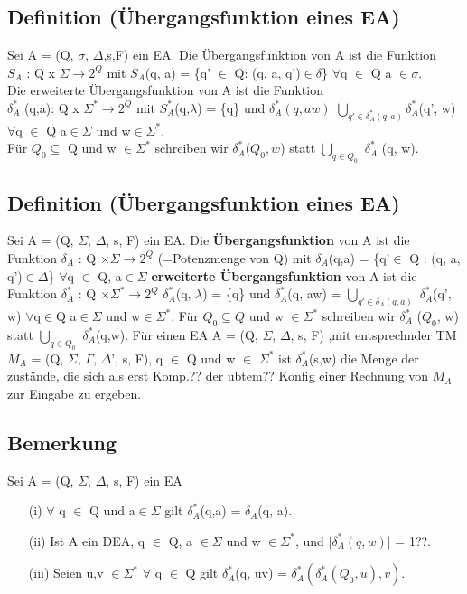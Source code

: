 \documentclass[a4paper,11pt]{article}
\begin{document}
\subsection{Definition (Übergangsfunktion eines EA)}
Sei A = (Q, $\sigma$, $\Delta$,s,F) ein EA. 
Die Übergangsfunktion von A ist die Funktion \\
$S_{A}$ : Q x $\Sigma \to 2^{Q}$ mit $S_{A}$(q, a) = \{q' $\in$ Q: (q, a, q')$\in \delta$\} $\forall$q $\in$ Q a $\in \sigma$.\\
Die erweiterte Übergangsfunktion von A ist die Funktion \\
$\delta_{A}^{*}$ (q,a): Q x $\Sigma^{*} \to 2^{Q}$ mit $S_{A}^{*}$(q,$\lambda$) = \{q\} und $\delta_{A}^{*}(q, aw)$ $\underset{q' \in \delta_{A}^{*}(q,a)}{\bigcup} \delta_{A}^{*}$(q', w) $\forall$q $\in$ Q a$\in \Sigma$ und w$\in \Sigma^{*}$.\\
Für $Q_{0} \subseteq $ Q und w $\in \Sigma^{*}$ schreiben wir $\delta_{A}^{*} $($Q_{0}, w$) statt $\underset{q \in Q_{0}}{\bigcup}$ $\delta_{A}^{*}$ (q, w).

\subsection{Definition (Übergangsfunktion eines EA)}
Sei A = (Q, $\Sigma$, $\Delta$, s, F) ein EA. Die \textbf{Übergangsfunktion} von A ist die Funktion $\delta_{A}$ : Q $\times \Sigma\rightarrow 2^{Q}$ (=Potenzmenge von Q) mit $\delta_{A}$(q,a) = \{q'$\in$ Q : (q, a, q')$\in \Delta$\} $\forall$q $\in$ Q, a$\in \Sigma$ \textbf{erweiterte Übergangsfunktion} von A ist die Funktion $\delta_{A}^{*}$ : Q $\times \Sigma^{*} \rightarrow 2^{Q}$ $\delta_{A}^{*}$(q, $\lambda$) = \{q\} und $\delta_{A}^{*}$(q, aw) = $\bigcup \limits_{q'\in \delta_{A}(q,a)}$ $\delta_{A}^{*}$(q', w) $\forall$q$\in$Q a$\in \Sigma$ und w$\in \Sigma^{*}$. Für $Q_{0} \subseteq Q$ und w $\in \Sigma^{*}$ schreiben wir $\delta_{A}^{*}$ ($Q_{0}$, w) statt $\bigcup \limits_{q \in Q_{0}}$ $\delta_{A}^{*}$(q,w). Für einen EA A = (Q, $\Sigma$, $\Delta$, s, F) ,mit entsprechnder TM $M_{A}$ = (Q, $\Sigma$, $\Gamma$, $\Delta$', s, F), q $\in$ Q und w $\in$ $\Sigma^{*}$ ist $\delta_{A}^{*}$(s,w) die Menge der zustände, die sich als erst Komp.?? der ubtem?? Konfig einer Rechnung von $M_{A}$ zur Eingabe zu ergeben.

\subsection{Bemerkung }
Sei A = (Q, $\Sigma$, $\Delta$, s, F) ein EA
\begin{itemize}
    \item [(i)] $\forall$ q $\in$ Q und a$\in \Sigma$ gilt $\delta_{A}^{*}$(q,a) = $\delta_{A}$(q, a).
    \item [(ii)] Ist A ein DEA, q $\in$ Q, a $\in \Sigma$ und w $\in \Sigma^{*}$, und $\lvert \delta_{A}^{*}(q,w) \rvert$ = 1??.
    \item[(iii)] Seien u,v $\in \Sigma^{*}$ $\forall$ q $\in$ Q gilt $\delta_{A}^{*}$(q, uv) = $\delta_{A}^{*}(\delta_{A}^{*}(Q_{0}, u), v)$.
\end{itemize}
\end{document}
